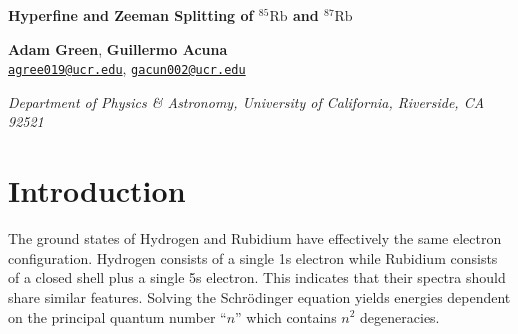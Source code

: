 \documentclass[12pt]{article}
\newcommand{\email}[1]{\href{mailto:#1}{\textcolor{mygreen1}{#1}}}
\newenvironment{institutions}[1][2em]{\begin{list}{}{\setlength\leftmargin{#1}\setlength\rightmargin{#1}}\item[]}{\end{list}}
\newcommand{\RbEF}{$^{85}\text{Rb}$ }
\newcommand{\RbES}{$^{87}\text{Rb}$ }
\begin{document}
	\begin{center}
		
		{\LARGE \bf Hyperfine and Zeeman Splitting of \RbEF and \RbES}\\

		\vspace{0.5cm}
		
		\textbf{Adam Green}, \textbf{Guillermo Acuna}\\
		
		\texttt{\footnotesize \email{agree019@ucr.edu}},
		\texttt{\footnotesize \email{gacun002@ucr.edu}}
		
		\vspace{0.5cm}
		
		
		\begin{institutions}[2.25cm]
			\footnotesize
			{\it 
				Department of Physics \& Astronomy, 
				University of  California, Riverside, 
				CA 92521	    
			}    
		\end{institutions}
		
		\vspace{0.5cm}
		
	\end{center}
	
	\vspace{0.5cm}
	\begin{abstract}
		In this experiment, study the hyperfine splitting and Zeeman effect for naturally occurring Rubidium using saturated absorption spectroscopy. For $^{85}\text{Rb}$, we measure the splitting between the $F=2$ and $F=3$ states to be $3320 \ \text{MHz} \pm 117 \ \text{MHz}$. For $^{87}\text{Rb}$, we determine the splitting between the $F=1$ and $F=2$ state to be $7390 \ \text{MHz} \pm 117 \ \text{MHz}$. We provide quantitative energy level diagrams for both isotopes of Rubidium. Further, upon the application of an external magnetic field, we measure the splitting between the hyperfine transitions. We provide an analysis of Zeeman splitting vs magnetic field strength and we determine the Land\'e g-factor to be $g_F = 0.307 \pm 0.0103$.
	\end{abstract}
	
	\tableofcontents
	
	
	\section{Introduction}
	The ground states of Hydrogen and Rubidium have effectively the same electron configuration. Hydrogen consists of a single 1s electron while Rubidium consists of a closed shell plus a single 5s electron. This indicates that their spectra should share similar features. Solving the Schr\"odinger equation yields energies dependent on the principal quantum number ``$n$'' which contains $n^2$ degeneracies.
	
\end{document}
